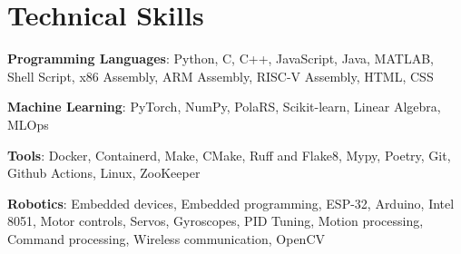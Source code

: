 \section{Technical Skills}

\begin{itemize}[leftmargin=0.15in, label={}]
  \small{\item{
\textbf{Programming Languages}{: %
  Python, %
  C, %
  C++, %
  JavaScript, %
  Java, %
  MATLAB, %
  Shell Script, %
  x86 Assembly, %
  ARM Assembly, %
  RISC-V Assembly, %
  HTML, %
  CSS %
}

\textbf{Machine Learning}{: %
  PyTorch, %
  NumPy, %
  PolaRS, %
  Scikit-learn, %
  Linear Algebra, %
  MLOps %
}

\textbf{Tools}{: %
  Docker, %
  Containerd, %
  Make, %
  CMake, %
  Ruff and Flake8, %
  Mypy, %
  Poetry, %
  Git, %
  Github Actions, %
  Linux, %
  ZooKeeper %
}

\textbf{Robotics}{: %
  Embedded devices, %
  Embedded programming, %
  ESP-32, %
  Arduino, %
  Intel 8051, %
  Motor controls, %
  Servos, %
  Gyroscopes, %
  PID Tuning, %
  Motion processing, %
  Command processing, %
  Wireless communication, %
  OpenCV %
}
   }}
 \end{itemize}



